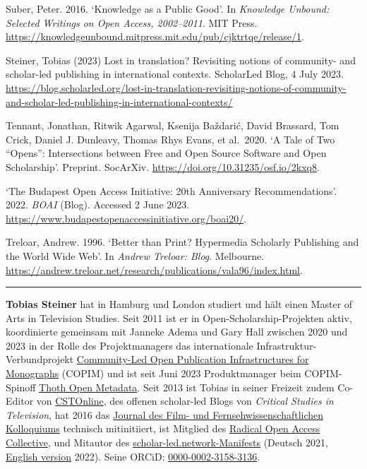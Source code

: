 \documentclass[a4paper,
fontsize=11pt,
oneside,
numbers=noperiodatend,
parskip=half-,
bibliography=totoc,
final
]{scrartcl}
\begin{document}
Suber, Peter. 2016. \enquote*{Knowledge as a Public Good}. In
\emph{Knowledge Unbound: Selected Writings on Open Access, 2002--2011}.
MIT Press.
\url{https://knowledgeunbound.mitpress.mit.edu/pub/cjktrtqe/release/1}.

Steiner, Tobias (2023) Lost in translation? Revisiting notions of
community- and scholar-led publishing in international contexts.
ScholarLed Blog, 4 July 2023.
\url{https://blog.scholarled.org/lost-in-translation-revisiting-notions-of-community-and-scholar-led-publishing-in-international-contexts/}

Tennant, Jonathan, Ritwik Agarwal, Ksenija Baždarić, David Brassard, Tom
Crick, Daniel J. Dunleavy, Thomas Rhys Evans, et al.~2020. \enquote*{A
Tale of Two \enquote{Opens}: Intersections between Free and Open Source
Software and Open Scholarship}. Preprint. SocArXiv.
\url{https://doi.org/10.31235/osf.io/2kxq8}.

\enquote*{The Budapest Open Access Initiative: 20th Anniversary
Recommendations}. 2022. \emph{BOAI} (Blog). Accessed 2 June 2023.
\url{https://www.budapestopenaccessinitiative.org/boai20/}.

Treloar, Andrew. 1996. \enquote*{Better than Print? Hypermedia Scholarly
Publishing and the World Wide Web}. In \emph{Andrew Treloar: Blog}.
Melbourne.
\url{https://andrew.treloar.net/research/publications/vala96/index.html}.

\begin{center}\rule{0.5\linewidth}{0.5pt}\end{center}

\textbf{Tobias Steiner} hat in Hamburg und London studiert und hält
einen Master of Arts in Television Studies. Seit 2011 ist er in
Open-Scholarship-Projekten aktiv, koordinierte gemeinsam mit Janneke
Adema und Gary Hall zwischen 2020 und 2023 in der Rolle des
Projektmanagers das internationale Infrastruktur-Verbundprojekt
\href{https://www.copim.ac.uk}{Community-Led Open Publication
Infrastructures for Monographs} (COPIM) und ist seit Juni 2023
Produktmanager beim COPIM-Spinoff \href{https://thoth.pub/}{Thoth Open
Metadata}. Seit 2013 ist Tobias in seiner Freizeit zudem Co-Editor von
\href{https://cstonline.net/}{CSTOnline}, des offenen scholar-led Blogs
von \emph{Critical Studies in Television}, hat 2016 das
\href{http://ffk-journal.de/}{Journal des Film- und
Fernsehwissenschaftlichen Kolloquiums} technisch mitinitiiert, ist
Mitglied des \href{https://radicaloa.disruptivemedia.org.uk/}{Radical
Open Access Collective}, und Mitautor des
\href{https://graphite.page/scholar-led-manifest/}{scholar-led.network-Manifests}
(Deutsch 2021,
\href{https://graphite.page/scholar-led-manifesto/}{English version}
2022). Seine ORCiD:
\href{https://orcid.org/0000-0002-3158-3136}{0000-0002-3158-3136}.
\end{document}
